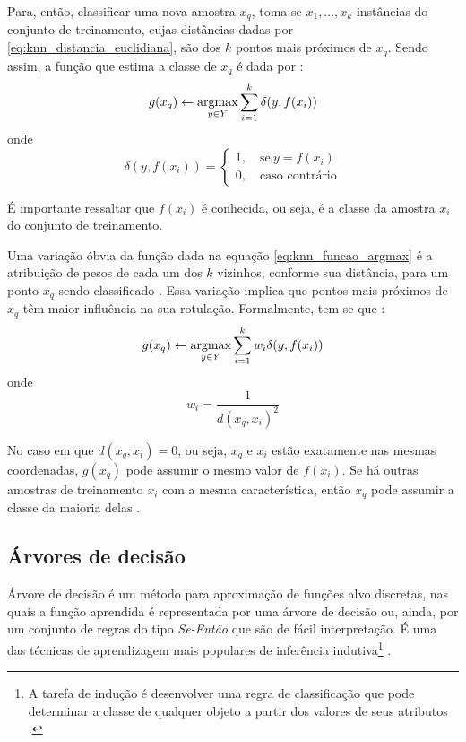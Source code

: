 Para, então, classificar uma nova amostra $x_q$, toma-se $x_1, \ldots, x_k$ instâncias do conjunto de treinamento, cujas distâncias dadas por \ref{eq:knn_distancia_euclidiana}, são dos $k$ pontos mais próximos de $x_q$. Sendo assim, a função que estima a classe de $x_q$ é dada por \citep{mitchell:97}:
\begin{equation}
\label{eq:knn_funcao_argmax}
g(x_q) \gets \operatorname*{argmax}_{y \in Y} \sum_{i=1}^k \delta (y, f(x_i))
\end{equation}
\noindent onde
\begin{equation}
\label{eq:knn_delta}
  \delta (y, f(x_i)) =  \begin{cases}
                1, \quad \text{se}\ y = f(x_i) \\
                0, \quad \text{caso contrário}
              \end{cases}
\end{equation}

É importante ressaltar que $f(x_i)$ é conhecida, ou seja, é a classe da amostra $x_i$ do conjunto de treinamento.

Uma variação óbvia da função dada na equação \ref{eq:knn_funcao_argmax} é a atribuição de pesos de cada um dos $k$ vizinhos, conforme sua distância, para um ponto $x_q$ sendo classificado \citep{mitchell:97}. Essa variação implica que pontos mais próximos de $x_q$ têm maior influência na sua rotulação. Formalmente, tem-se que \citep{mitchell:97}:
\begin{equation}
\label{eq:knn_funcao_argmax_pesos}
g(x_q) \gets \operatorname*{argmax}_{y \in Y} \sum_{i=1}^k w_i \delta (y, f(x_i))
\end{equation}
\noindent onde
\begin{equation}
\label{eq:knn_funcao_peso}
  w_i = \frac{1}{d(x_q, x_i)^2}
\end{equation}

No caso em que $d(x_q, x_i) = 0$, ou seja, $x_q$ e $x_i$ estão exatamente nas mesmas coordenadas, $g(x_q)$ pode assumir o mesmo valor de $f(x_i)$. Se há outras amostras de treinamento $x_i$ com a mesma característica, então $x_q$ pode assumir a classe da maioria delas \citep{mitchell:97}.


\subsection{Árvores de decisão}
\label{sec:clasificadores_arvores_decisao}
Árvore de decisão é um método para aproximação de funções alvo discretas, nas quais a função aprendida é representada por uma árvore de decisão ou, ainda, por um conjunto de regras do tipo \emph{Se-Então} que são de fácil interpretação. É uma das técnicas de aprendizagem mais populares de inferência indutiva\footnote{A tarefa de indução é desenvolver uma regra de classificação que pode determinar a classe de qualquer objeto a partir dos valores de seus atributos \citep{quinlan:86}.} \citep{mitchell:97}.

